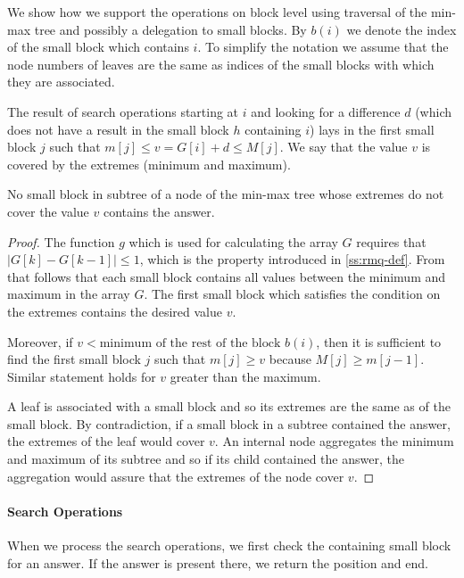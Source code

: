 \bigskip

We show how we support the operations on block level using traversal of the min-max tree and possibly a delegation to small blocks.
By $b(i)$ we denote the index of the small block which contains $i$.
To simplify the notation we assume that the node numbers of leaves are the same as indices of the small blocks with which they are associated.

\begin{lemma}
	The result of search operations starting at $i$ and looking for a difference $d$ (which does not have a result in the small block $h$ containing $i$) lays in the first small block $j$ such that $m[j] \le v = G[i] + d \le M[j]$.
	We say that the value $v$ is covered by the extremes (minimum and maximum).
	
	No small block in subtree of a node of the min-max tree whose extremes do not cover the value $v$ contains the answer.
\end{lemma}
\begin{proof}
	The function $g$ which is used for calculating the array $G$ requires that $| G[k] - G[k-1] | \le 1$, which is the property introduced in \ref{ss:rmq-def}.
	From that follows that each small block contains all values between the minimum and maximum in the array $G$.
	The first small block which satisfies the condition on the extremes contains the desired value $v$.
	
	Moreover, if $v < \textrm{minimum of the rest of the block } b(i)$, then it is sufficient to find the first small block $j$ such that $m[j] \ge v$ because $M[j] \ge m[j-1]$.
	Similar statement holds for $v$ greater than the maximum.
	
	A leaf is associated with a small block and so its extremes are the same as of the small block.
	By contradiction, if a small block in a subtree contained the answer, the extremes of the leaf would cover $v$.
	An internal node aggregates the minimum and maximum of its subtree and so if its child contained the answer, the aggregation would assure that the extremes of the node cover $v$.
\end{proof}

\paragraph{Search Operations}

When we process the search operations, we first check the containing small block for an answer.
If the answer is present there, we return the position and end.

